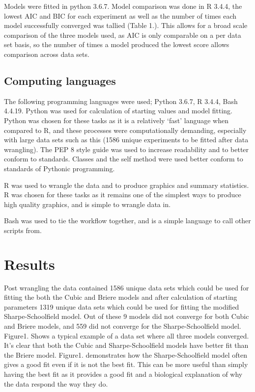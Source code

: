 \documentclass[11pt]{article}
\begin{document}
Models were fitted in python 3.6.7. Model comparison was done in R 3.4.4, the lowest AIC and BIC for each experiment as well as the number of times each model successfully converged was tallied (Table 1.). This allows for a broad scale comparison of the three models used, as AIC is only comparable on a per data set basis, so the number of times a model produced the lowest score allows comparison across data sets.

\subsection{Computing languages}
The following programming languages were used; Python 3.6.7, R 3.4.4, Bash 4.4.19. 
Python was used for calculation of starting values and model fitting. Python was chosen for these tasks as it is a relatively ‘fast’ language when compared to R, and these processes were computationally demanding, especially with large data sets such as this (1586 unique experiments to be fitted after data wrangling). The PEP 8 style guide\citep{PEP82019} was used to increase readability and to better conform to standards. Classes and the self method were used better conform to standards of Pythonic programming. 

R was used to wrangle the data and to produce graphics \citep{GGplot2016} and summary statistics. R was chosen for these tasks as it remains one of the simplest ways to produce high quality graphics, and is simple to wrangle data in. 

Bash was used to tie the workflow together, and is a simple language to call other scripts from.

\section{Results }
Post wrangling the data contained 1586 unique data sets which could be used for fitting the both the Cubic and Briere models and after calculation of starting parameters 1319 unique data sets which could be used for fitting the modified Sharpe-Schoolfield model. Out of these 9 models did not converge for both Cubic and Briere models, and 559 did not converge for the Sharpe-Schoolfield model. Figure1. Shows a typical example of a data set where all three models converged.  It’s clear that both the Cubic and Sharpe-Schoolfield models have better fit than the Briere model. Figure1. demonstrates how the Sharpe-Schoolfield model often gives a good fit even if it is not the best fit. This can be more useful than simply having the best fit as it provides a good fit and a biological explanation of why the data respond the way they do.
\end{document}
